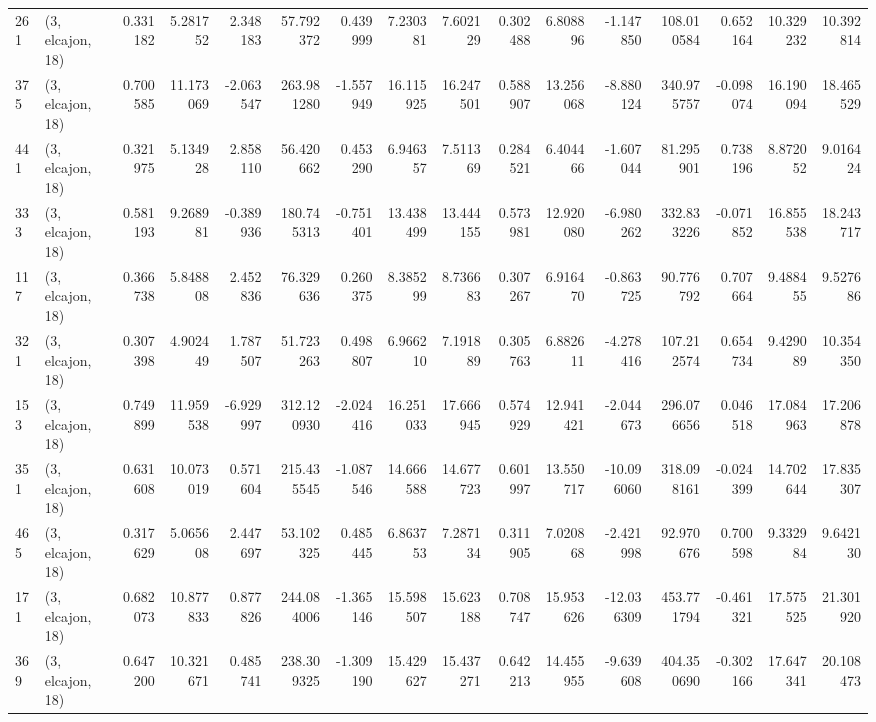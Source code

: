 \begin{tabular}{llrrrrrrrrrrrrrr}
261 &  (3, elcajon, 18) &   0.331182 &   5.281752 &   2.348183 &    57.792372 &   0.439999 &   7.230381 &   7.602129 &  0.302488 &   6.808896 &  -1.147850 &   108.010584 &   0.652164 &  10.329232 &  10.392814 \\
375 &  (3, elcajon, 18) &   0.700585 &  11.173069 &  -2.063547 &   263.981280 &  -1.557949 &  16.115925 &  16.247501 &  0.588907 &  13.256068 &  -8.880124 &   340.975757 &  -0.098074 &  16.190094 &  18.465529 \\
441 &  (3, elcajon, 18) &   0.321975 &   5.134928 &   2.858110 &    56.420662 &   0.453290 &   6.946357 &   7.511369 &  0.284521 &   6.404466 &  -1.607044 &    81.295901 &   0.738196 &   8.872052 &   9.016424 \\
333 &  (3, elcajon, 18) &   0.581193 &   9.268981 &  -0.389936 &   180.745313 &  -0.751401 &  13.438499 &  13.444155 &  0.573981 &  12.920080 &  -6.980262 &   332.833226 &  -0.071852 &  16.855538 &  18.243717 \\
117 &  (3, elcajon, 18) &   0.366738 &   5.848808 &   2.452836 &    76.329636 &   0.260375 &   8.385299 &   8.736683 &  0.307267 &   6.916470 &  -0.863725 &    90.776792 &   0.707664 &   9.488455 &   9.527686 \\
321 &  (3, elcajon, 18) &   0.307398 &   4.902449 &   1.787507 &    51.723263 &   0.498807 &   6.966210 &   7.191889 &  0.305763 &   6.882611 &  -4.278416 &   107.212574 &   0.654734 &   9.429089 &  10.354350 \\
153 &  (3, elcajon, 18) &   0.749899 &  11.959538 &  -6.929997 &   312.120930 &  -2.024416 &  16.251033 &  17.666945 &  0.574929 &  12.941421 &  -2.044673 &   296.076656 &   0.046518 &  17.084963 &  17.206878 \\
351 &  (3, elcajon, 18) &   0.631608 &  10.073019 &   0.571604 &   215.435545 &  -1.087546 &  14.666588 &  14.677723 &  0.601997 &  13.550717 & -10.096060 &   318.098161 &  -0.024399 &  14.702644 &  17.835307 \\
465 &  (3, elcajon, 18) &   0.317629 &   5.065608 &   2.447697 &    53.102325 &   0.485445 &   6.863753 &   7.287134 &  0.311905 &   7.020868 &  -2.421998 &    92.970676 &   0.700598 &   9.332984 &   9.642130 \\
171 &  (3, elcajon, 18) &   0.682073 &  10.877833 &   0.877826 &   244.084006 &  -1.365146 &  15.598507 &  15.623188 &  0.708747 &  15.953626 & -12.036309 &   453.771794 &  -0.461321 &  17.575525 &  21.301920 \\
369 &  (3, elcajon, 18) &   0.647200 &  10.321671 &   0.485741 &   238.309325 &  -1.309190 &  15.429627 &  15.437271 &  0.642213 &  14.455955 &  -9.639608 &   404.350690 &  -0.302166 &  17.647341 &  20.108473 \\

\end{tabular}
